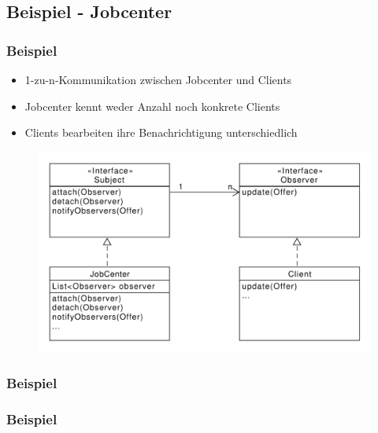 \subsection{Beispiel - Jobcenter}
\begin{frame}
	\frametitle{Beispiel}
	\begin{itemize}
		\item 1-zu-n-Kommunikation zwischen Jobcenter und Clients 
		\item Jobcenter kennt weder Anzahl noch konkrete Clients
		\item Clients bearbeiten ihre Benachrichtigung unterschiedlich
	\end{itemize}		 
  	\begin{figure}
		\includegraphics[scale=.4]{paper/observer/arbeitsvermittlung}
	\end{figure}
\end{frame}


\begin{frame}
\frametitle{Beispiel}

\end{frame}

\begin{frame}
\frametitle{Beispiel}
\end{frame}

